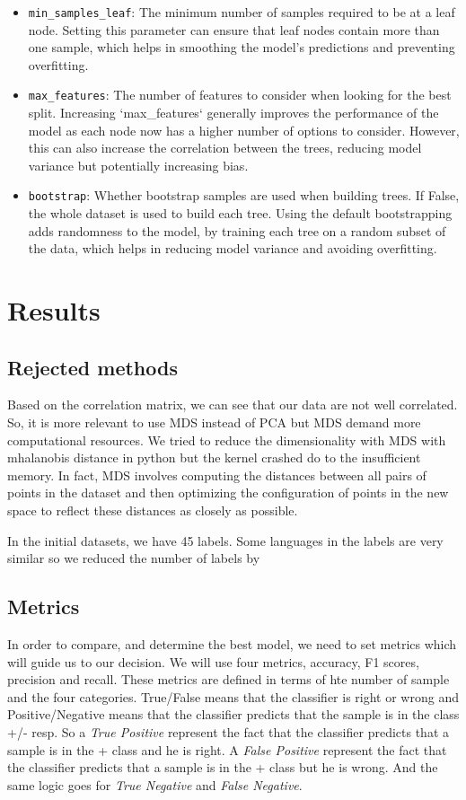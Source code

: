 \documentclass[twocolumn]{article}
\begin{document}
\begin{itemize}
    \item \texttt{min\_samples\_leaf}: The minimum number of samples required to be at a leaf node. Setting this parameter can ensure that leaf nodes contain more than one sample, which helps in smoothing the model's predictions and preventing overfitting.

    \item \texttt{max\_features}: The number of features to consider when looking for the best split. Increasing `max\_features` generally improves the performance of the model as each node now has a higher number of options to consider. However, this can also increase the correlation between the trees, reducing model variance but potentially increasing bias.

    \item \texttt{bootstrap}: Whether bootstrap samples are used when building trees. If False, the whole dataset is used to build each tree. Using the default bootstrapping adds randomness to the model, by training each tree on a random subset of the data, which helps in reducing model variance and avoiding overfitting.
    
\end{itemize}


\section{Results}
\subsection{Rejected methods}
Based on the correlation matrix, we can see that our data are not well correlated. So, it is more relevant to use MDS instead of PCA but MDS demand more computational resources. We tried to reduce the dimensionality with MDS with mhalanobis distance in python but the kernel crashed do to the insufficient memory. In fact, MDS involves computing the distances between all pairs of points in the dataset and then optimizing the configuration of points in the new space to reflect these distances as closely as possible.

In the initial datasets, we have 45 labels. Some languages in the labels are very similar so we reduced the number of labels by 


\subsection{Metrics}
In order to compare, and determine the best model, we need to set metrics which will guide us to our decision. We will use four metrics, accuracy, F1 scores, precision and recall. These metrics are defined in terms of hte number of sample and the four categories. True/False means that the classifier is right or wrong and Positive/Negative means that the classifier predicts that the sample is in the class +/- resp. So a \textit{True Positive} represent the fact that the classifier predicts that a sample is in the + class and he is right. A \textit{False Positive} represent the fact that the classifier predicts that a sample is in the + class but he is wrong. And the same logic goes for \textit{True Negative}  and \textit{False Negative}.
\end{document}
